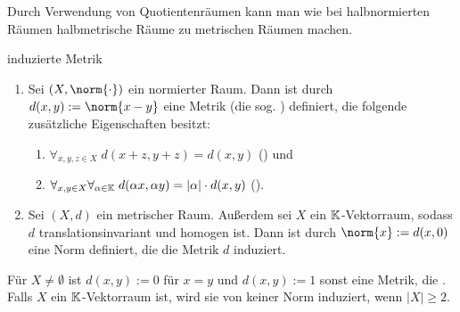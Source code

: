 \begin{Bem}
    Durch Verwendung von Quotientenräumen kann man wie bei halbnormierten Räumen
    halbmetrische Räume zu metrischen Räumen machen.
\end{Bem}

\begin{Satz}{induzierte Metrik}
    \begin{enumerate}
        \item
        Sei $(X, \norm{\cdot})$ ein normierter Raum.
        Dann ist durch $d(x, y) := \norm{x - y}$ eine Metrik
        (die sog. ) definiert,
        die folgende zusätzliche Eigenschaften besitzt:
        \begin{enumerate}[start=4]
            \item
            $\forall_{x, y, z \in X}\; d(x + z, y + z) = d(x, y)$
            () und

            \item
            $\forall_{x, y \in X} \forall_{\alpha \in \mathbb{K}}\;
            d(\alpha x, \alpha y) = |\alpha| \cdot d(x, y)$
            ().
        \end{enumerate}

        \item
        Sei $(X, d)$ ein metrischer Raum.
        Außerdem sei $X$ ein $\mathbb{K}$-Vektorraum, sodass
        $d$ translationsinvariant und homogen ist.
        Dann ist durch $\norm{x} := d(x, 0)$ eine Norm definiert,
        die die Metrik $d$ induziert.
    \end{enumerate}
\end{Satz}

\begin{Bsp}
    Für $X \not= \emptyset$ ist $d(x, y) := 0$ für $x = y$ und $d(x, y) := 1$ sonst
    eine Metrik, die .
    Falls $X$ ein $\mathbb{K}$-Vektorraum ist, wird sie von keiner Norm induziert, wenn $|X| \ge 2$.
\end{Bsp}

\pagebreak
